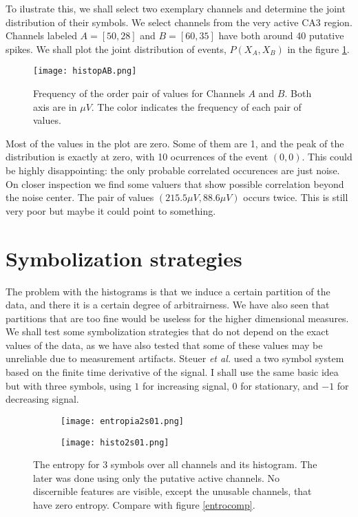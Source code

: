 \documentclass[10pt]{article}
\begin{document}
To ilustrate this, we shall select two exemplary channels and
determine the joint distribution of their symbols. We select channels from
the very active CA3 region. Channels labeled $A=[50,28]$ and $B=[60,35]$ have both
around 40 putative spikes. We shall plot the joint distribution of events,
$P(X_A, X_B)$ in the figure \ref{histopAB}.

\begin{figure}
  \begin{center}
    \texttt{[image: histopAB.png]}
  \end{center}
  \caption{Frequency of the order pair of values for Channels $A$ and $B$.
    Both axis are in $\mu V$.  The color indicates the frequency of each pair
  of values.}
  \label{histopAB}
\end{figure}

Most of the values in the plot are zero. Some of them are 1, and the peak of
the distribution is exactly at zero, with 10 ocurrences of the event $(0,0)$.
This could be highly disappointing: the only probable correlated occurences are
just noise. On closer inspection we find some valuers that show possible correlation
beyond the noise center. The pair of values $(215.5 \mu V, 88.6 \mu V)$ occurs twice.
This is still very poor but maybe it could point to something. 


\section{Symbolization strategies}

The problem with the histograms is that we induce a certain partition of the
data, and there it is a certain degree of arbitrairness. We have also seen
that partitions that are too fine would be useless for the higher dimensional
measures. We shall test some symbolization strategies that do not depend
on the exact values of the data, as we have also tested that some of these
values may be unreliable due to measurement artifacts.
Steuer \emph{et al.} \cite{Steuer2004} used a two symbol system based on
the finite time derivative of the signal. I shall use the same basic idea
but with three symbols, using $1$ for increasing signal, $0$ for stationary, and
$-1$ for decreasing signal.

\begin{figure}
  \centering
  \begin{subfigure}[b]{0.49\textwidth}
    \texttt{[image: entropia2s01.png]}
  \end{subfigure}
   \begin{subfigure}[b]{0.49\textwidth}
    \texttt{[image: histo2s01.png]}
  \end{subfigure}
   \caption{The entropy for 3 symbols over all channels  and its histogram. The later was done using only the putative active channels. No discernible features are visible,
     except the unusable channels, that have zero entropy. Compare with figure
     \ref{entrocomp}. }
   \label{entro2s01}
\end{figure}
\end{document}

